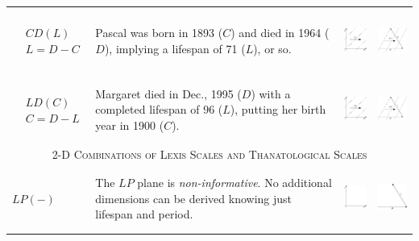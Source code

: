\documentclass[
  12pt
]{scrartcl}
\begin{document}
\begin{center}
\begin{longtable}{m{}m{}m{}m{}}
  $$\begin{aligned}
    &CD(L) \\
    &L = D - C
  \end{aligned}$$ &
  Pascal was born in 1893 ($C$) and died in 1964 ($D$), implying a lifespan of 71 ($L$), or so. &
  \includegraphics[height = 2cm]{../fig/CDl.pdf} &
  \includegraphics[height = 2cm]{../fig/CDl_iso.pdf}  \\
  $$\begin{aligned}
    &LD(C) \\
    &C = D - L
  \end{aligned}$$ &
  Margaret died in Dec., 1995 ($D$) with a completed lifespan of 96 ($L$), putting her birth year in 1900 ($C$). &
  \includegraphics[height = 2cm]{../fig/LDc.pdf} &
  \includegraphics[height = 2cm]{../fig/LDc_iso.pdf}  \\
  \midrule
  \multicolumn{4}{c}{\textsc{2-D Combinations of Lexis Scales and Thanatological Scales}} \\
  \midrule
  $LP(-)$ &
  The $LP$ plane is \emph{non-informative}. No additional dimensions can be derived knowing just lifespan and period. &
  \includegraphics[height = 2cm]{../fig/LP.pdf} &
  \includegraphics[height = 2cm]{../fig/LP_iso.pdf}  \\

\end{longtable}
\end{center}
\end{document}
